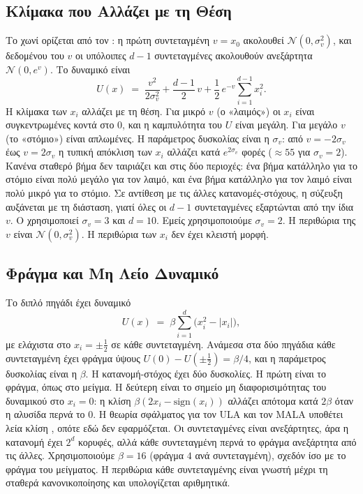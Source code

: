 \subsection{Κλίμακα που Αλλάζει με τη Θέση}
\label{sec:bg-funnel}

Το χωνί ορίζεται από τον \citet{neal2003slice}: η πρώτη συντεταγμένη
$v = x_0$ ακολουθεί $\mathcal{N}(0, \sigma_v^2)$, και δεδομένου του $v$ οι
υπόλοιπες $d-1$ συντεταγμένες ακολουθούν ανεξάρτητα $\mathcal{N}(0, e^{v})$. Το
δυναμικό είναι
\begin{equation}
  U(x) \;=\; \frac{v^2}{2\sigma_v^2} + \frac{d-1}{2}\, v
  + \frac12\, e^{-v} \sum_{i=1}^{d-1} x_i^2 .
\end{equation}
Η κλίμακα των $x_i$ αλλάζει με τη θέση. Για μικρό $v$ (ο «λαιμός») οι $x_i$ είναι
συγκεντρωμένες κοντά στο $0$, και η καμπυλότητα του $U$ είναι μεγάλη. Για
μεγάλο $v$ (το «στόμιο») είναι απλωμένες. Η παράμετρος δυσκολίας είναι η
$\sigma_v$: από $v = -2\sigma_v$ έως $v = 2\sigma_v$ η τυπική απόκλιση των $x_i$
αλλάζει κατά $e^{2\sigma_v}$ φορές ($\approx 55$ για $\sigma_v = 2$). Κανένα
σταθερό βήμα δεν ταιριάζει και στις δύο περιοχές: ένα βήμα κατάλληλο για το
στόμιο είναι πολύ μεγάλο για τον λαιμό, και ένα βήμα κατάλληλο για τον λαιμό
είναι πολύ μικρό για το στόμιο. Σε αντίθεση με τις άλλες κατανομές-στόχους, η σύζευξη
αυξάνεται με τη διάσταση, γιατί όλες οι $d-1$ συντεταγμένες εξαρτώνται από την
ίδια $v$. Ο \citet{neal2003slice} χρησιμοποιεί $\sigma_v = 3$ και $d = 10$.
Εμείς χρησιμοποιούμε $\sigma_v = 2$. Η περιθώρια της $v$ είναι
$\mathcal{N}(0, \sigma_v^2)$. Η περιθώρια των $x_i$ δεν έχει κλειστή μορφή.

\subsection{Φράγμα και Μη Λείο Δυναμικό}
\label{sec:bg-double-well}

Το διπλό πηγάδι έχει δυναμικό
\begin{equation}
  U(x) \;=\; \beta \sum_{i=1}^{d} \bigl( x_i^2 - |x_i| \bigr),
\end{equation}
με ελάχιστα στο $x_i = \pm\tfrac12$ σε κάθε συντεταγμένη. Ανάμεσα στα δύο πηγάδια
κάθε συντεταγμένη έχει φράγμα ύψους $U(0) - U(\pm\tfrac12) = \beta/4$, και η
παράμετρος δυσκολίας είναι η $\beta$. Η κατανομή-στόχος έχει δύο δυσκολίες. Η πρώτη είναι
το φράγμα, όπως στο μείγμα. Η δεύτερη είναι το σημείο μη διαφορισιμότητας του δυναμικού στο $x_i = 0$:
η κλίση $\beta(2x_i - \mathrm{sign}(x_i))$ αλλάζει απότομα κατά $2\beta$ όταν η
αλυσίδα περνά το $0$. Η θεωρία σφάλματος για τον ULA και τον MALA υποθέτει
λεία κλίση \citep{dalalyan2017theoretical, durmus2017nonasymptotic}, οπότε εδώ
δεν εφαρμόζεται. Οι συντεταγμένες είναι ανεξάρτητες, άρα η κατανομή έχει $2^d$
κορυφές, αλλά κάθε συντεταγμένη περνά το φράγμα ανεξάρτητα από τις άλλες.
Χρησιμοποιούμε $\beta = 16$ (φράγμα $4$ ανά συντεταγμένη), σχεδόν ίσο με το
φράγμα του μείγματος. Η περιθώρια κάθε συντεταγμένης είναι γνωστή μέχρι τη
σταθερά κανονικοποίησης και υπολογίζεται αριθμητικά.

